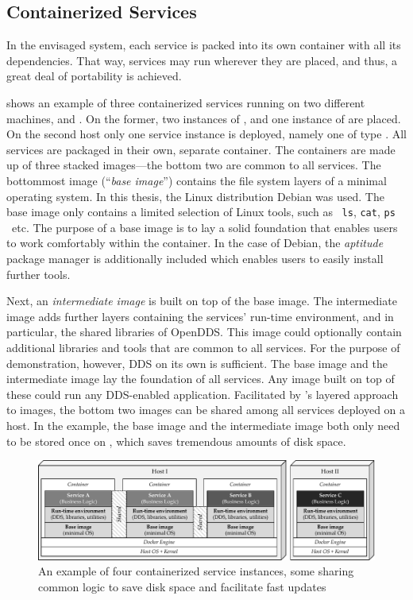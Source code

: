 %
%
%
%
%
%
%
%
%
%
%
\subsection{Containerized Services} \label{sec:containerized-services}
In the envisaged system, each service is packed into its own container with all its dependencies. That way, services may run wherever they are placed, and thus, a great deal of portability is achieved.

 shows an example of three containerized services running on two different machines,  and . On the former, two instances of , and one instance of  are placed. On the second host only one service instance is deployed, namely one of type . All services are packaged in their own, separate container. The containers are made up of three stacked images---the bottom two are common to all services. The bottommost image (``\emph{base image}'') contains the file system layers of a minimal operating system. In this thesis, the Linux distribution Debian was used. The base image only contains a limited selection of Linux tools, such as \ \texttt{ls}, \texttt{cat}, \texttt{ps} \ etc. The purpose of a base image is to lay a solid foundation that enables users to work comfortably within the container. In the case of Debian, the \emph{aptitude} package manager is additionally included which enables users to easily install further tools.

Next, an \emph{intermediate image} is built on top of the base image. The intermediate image adds further layers containing the services' run-time environment, and in particular, the shared libraries of OpenDDS. This image could optionally contain additional libraries and tools that are common to all services. For the purpose of demonstration, however, DDS on its own is sufficient. The base image and the intermediate image lay the foundation of all services. Any image built on top of these could run any DDS-enabled application. Facilitated by \docker 's layered approach to images, the bottom two images can be shared among all services deployed on a host. In the example, the base image and the intermediate image both only need to be stored once on , which saves tremendous amounts of disk space.

\begin{figure}[htpb]
  \centering
  \includegraphics[width=\textwidth]{figures/docker-sharing}
  \caption[An example of containerized services]{An example of four containerized service instances, some sharing common logic to save disk space and facilitate fast updates}\label{fig:service-containers}
\end{figure}


